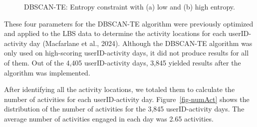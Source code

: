 \documentclass[
  letterpaper,
  number,
  review,
  3p]{elsarticle}
\begin{document}
\begin{figure}[H]


\caption{\label{fig-parameter_4}DBSCAN-TE: Entropy constraint with (a)
low and (b) high entropy.}

\end{figure}%

These four parameters for the DBSCAN-TE algorithm were previously
optimized and applied to the LBS data to determine the activity
locations for each userID-activity day (Macfarlane et al., 2024).
Although the DBSCAN-TE algorithm was only used on high-scoring
userID-activity days, it did not produce results for all of them. Out of
the 4,405 userID-activity days, 3,845 yielded results after the
algorithm was implemented.

After identifying all the activity locations, we totaled them to
calculate the number of activities for each userID-activity day.
Figure~\ref{fig-numAct} shows the distribution of the number of
activities for the 3,845 userID-activity days. The average number of
activities engaged in each day was 2.65 activities.
\end{document}
